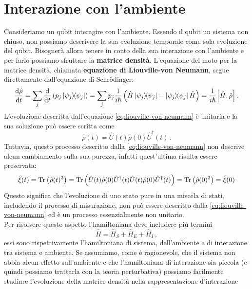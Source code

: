 \vspace{0.5cm}
\noindent {}

\section{Interazione con l'ambiente}

Consideriamo un qubit interagire con l'ambiente. Essendo il qubit un sistema non chiuso, non possiamo descrivere la sua evoluzione temporale come sola evoluzione del qubit. Bisognerà allora tenere in conto della sua interazione con l'ambiente e per farlo possiamo sfruttare la \textbf{matrice densità}. L'equazione del moto per la matrice densità, chiamata \textbf{equazione di Liouville-von Neumann}, segue direttamente dall'equazione di Schrödinger:
\begin{equation}
    \dv{\hat \rho}{t} = \sum_j \dv{t} \left(p_j\op{\psi_j}{\psi_j}\right)=\sum_j p_j\frac{1}{i\hbar}\left(\hat H \op{\psi_j}{\psi_j}-\op{\psi_j}{\psi_j}\hat H\right)=\frac{1}{i\hbar}\comm{\hat H}{\hat \rho} \, .
    \label{eq:liouville-von-neumann}
\end{equation}
L'evoluzione descritta dall'equazione \eqref{eq:liouville-von-neumann} è unitaria e la sua soluzione può essere scritta come
\begin{equation*}
    \hat \rho (t) = \hat U(t)\hat \rho(0) \hat U^\dagger(t) \, .
\end{equation*}
Tuttavia, questo processo descritto dalla \eqref{eq:liouville-von-neumann} non descrive alcun cambiamento sulla sua purezza, infatti quest'ultima risulta essere preservata:
\begin{equation*}
    \hat \xi(t) = \Tr\left(\hat \rho(t)^2\right) = \Tr\left(\hat U(t)\hat \rho(0) \hat U^\dagger(t)\hat U(t)\hat \rho(0) \hat U^\dagger(t)\right)=\Tr\left(\hat \rho (0)^2\right)=\hat \xi(0)
\end{equation*}
Questo significa che l'evoluzione di uno stato pure in una miscela di stati, includendo il processo di misurazione, non può essere descritto dalla \eqref{eq:liouville-von-neumann} ed è un processo essenzialmente non unitario.\\
Per risolvere questo aspetto l'hamiltoniana deve includere più termini
\begin{equation*}
    \hat H = \hat H_S + \hat H_E + \hat H_I \, ,
\end{equation*}
essi sono rispettivamente l'hamiltoniana di sistema, dell'ambiente e di interazione tra sistema e ambiente. Se assumiamo, come è ragionevole, che il sistema non abbia alcun effetto sull'ambiente e che l'hamiltoniana di interazione sia piccola (e quindi possiamo trattarla con la teoria perturbativa) possiamo facilmente studiare l'evoluzione della matrice densità nella rappresentazione d'interazione
